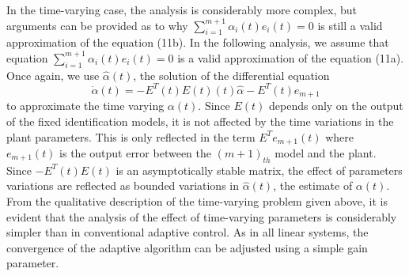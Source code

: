 \documentclass[conference]{IEEEtran}
\begin{document}
In the time-varying case, the analysis is considerably more complex, but arguments can be provided as to why $\sum_{i=1}^{m+1}\alpha_{i}(t)e_{i}(t)=0$ is still a valid approximation of the equation (11b).
In the following analysis, we assume that equation $\sum_{i=1}^{m+1}\alpha_{i}(t)e_{i}(t)=0$ is a valid approximation of the equation (11a). Once again, we use $\hat{\alpha}(t)$, the solution of the differential equation
\begin{equation}
\label{alpha differential equation}
\dot{\alpha}(t)=-E^{T}(t)E(t)(t)\hat{\alpha}-E^{T}(t)e_{m+1}
\end{equation}
to approximate the time varying $\alpha(t)$. Since $E(t)$ depends only on the output of the fixed identification models, it is not affected by the time variations in the plant parameters. This is only reflected in the term $E^{T}e_{m+1}(t)$ where $e_{m+1}(t)$ is the output error between the $(m+1)_{th}$ model and the plant. Since $-E^{T}(t)E(t)$ is an asymptotically stable matrix, the effect of  parameters variations are reflected as bounded variations in $\hat{\alpha}(t)$, the estimate of $\alpha(t)$. From the qualitative description of the time-varying problem given above, it is evident that the analysis of the effect of time-varying parameters is considerably simpler than in conventional adaptive control. As in all linear systems, the convergence of the adaptive algorithm can be adjusted using a simple gain parameter.
\end{document}
